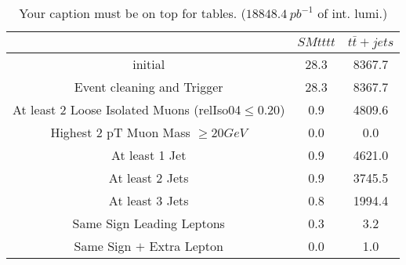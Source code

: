 \documentclass{article}
\begin{document}
\begin{table}
\caption{Your caption must be on top for tables. ($18848.4~pb^{-1}$ of int. lumi.)}
\label{tab:}
\centering
\begin{tabular}{|c|cc|}
\toprule
&$SM tttt$	&$t\bar{t}+jets$	\\

\midrule
initial&	28.3	&8367.7	\\

Event cleaning and Trigger&	28.3	&8367.7	\\

At least 2 Loose Isolated Muons (relIso04$\leq 0.20$)&	0.9	&4809.6	\\

Highest 2 pT Muon Mass $\geq 20 GeV$&	0.0	&0.0	\\

At least 1  Jet&	0.9	&4621.0	\\

At least 2 Jets&	0.9	&3745.5	\\

At least 3 Jets&	0.8	&1994.4	\\

Same Sign Leading Leptons&	0.3	&3.2	\\

Same Sign $+$ Extra Lepton&	0.0	&1.0	\\

\bottomrule
\end{tabular}
\end{table}
\end{document}
